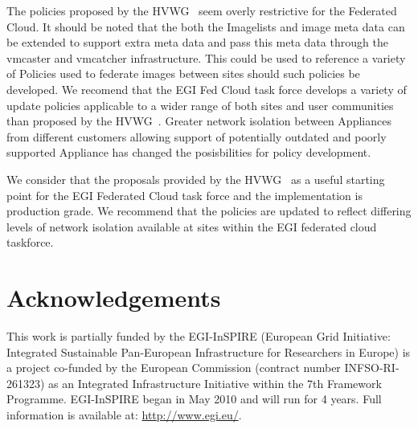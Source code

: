 \documentclass[oribibl]{llncs}
\begin{document}
The policies proposed by the HVWG~\cite{hepix} seem overly restrictive for the Federated Cloud. It should be noted that the both the Imagelists and image meta data can be extended to support extra meta data and pass this meta data through the vmcaster and vmcatcher infrastructure. This could be used to reference a variety of Policies used to federate images between sites should such policies be developed. We recomend that the EGI Fed Cloud task force develops a variety of update policies applicable to a wider range of both sites and user communities than proposed by the HVWG~\cite{hepix}. Greater network isolation between Appliances from different customers allowing support of potentially outdated and poorly supported Appliance has changed the posisbilities for policy development.

We consider that the proposals provided by the HVWG~\cite{hepix} as a useful starting point for the EGI Federated Cloud task force and the implementation is production grade. We recommend that the policies are updated to reflect differing levels of network isolation available at sites within the EGI federated cloud taskforce.

\section*{Acknowledgements}
\label{sect-acknowledgements}
This work is partially funded by the  EGI-InSPIRE (European Grid Initiative: Integrated Sustainable
Pan-European Infrastructure for Researchers in Europe) is a project co-funded by the European Commission 
(contract number INFSO-RI-261323) as an Integrated Infrastructure Initiative within the 7th Framework 
Programme. EGI-InSPIRE began in May 2010 and will run for 4 years. Full information is available at:
\url{http://www.egi.eu/}.

%
%
%


\end{document}
